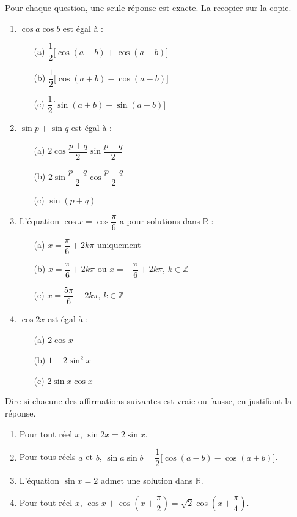 \documentclass[11pt]{article}
\begin{document}
\begin{exercice}
Pour chaque question, une seule réponse est exacte. La recopier sur la copie.
\begin{enumerate}
\item $\cos a \cos b$ est égal à :
\begin{enumerate}
\item[(a)] $\dfrac{1}{2}\big[\cos(a+b)+\cos(a-b)\big]$
\item[(b)] $\dfrac{1}{2}\big[\cos(a+b)-\cos(a-b)\big]$
\item[(c)] $\dfrac{1}{2}\big[\sin(a+b)+\sin(a-b)\big]$
\end{enumerate}
\item $\sin p + \sin q$ est égal à :
\begin{enumerate}
\item[(a)] $2\cos\dfrac{p+q}{2}\sin\dfrac{p-q}{2}$
\item[(b)] $2\sin\dfrac{p+q}{2}\cos\dfrac{p-q}{2}$
\item[(c)] $\sin(p+q)$
\end{enumerate}
\item L'équation $\cos x = \cos\dfrac{\pi}{6}$ a pour solutions dans $\mathbb{R}$ :
\begin{enumerate}
\item[(a)] $x = \dfrac{\pi}{6} + 2k\pi$ uniquement
\item[(b)] $x = \dfrac{\pi}{6} + 2k\pi$ ou $x = -\dfrac{\pi}{6} + 2k\pi$, $k \in \mathbb{Z}$
\item[(c)] $x = \dfrac{5\pi}{6} + 2k\pi$, $k \in \mathbb{Z}$
\end{enumerate}
\item $\cos 2x$ est égal à :
\begin{enumerate}
\item[(a)] $2\cos x$
\item[(b)] $1 - 2\sin^2 x$
\item[(c)] $2\sin x \cos x$
\end{enumerate}
\end{enumerate}
\end{exercice}

\begin{exercice}
Dire si chacune des affirmations suivantes est vraie ou fausse, en justifiant la réponse.
\begin{enumerate}
\item Pour tout réel $x$, $\sin 2x = 2\sin x$.
\item Pour tous réels $a$ et $b$, $\sin a \sin b = \dfrac{1}{2}\big[\cos(a-b) - \cos(a+b)\big]$.
\item L'équation $\sin x = 2$ admet une solution dans $\mathbb{R}$.
\item Pour tout réel $x$, $\cos x + \cos\left(x + \dfrac{\pi}{2}\right) = \sqrt{2}\cos\left(x + \dfrac{\pi}{4}\right)$.
\end{enumerate}
\end{exercice}
\end{document}
